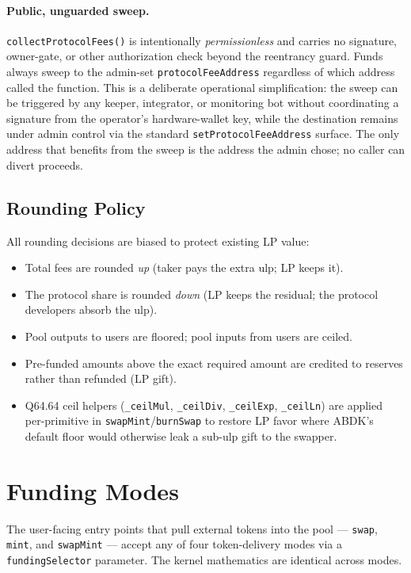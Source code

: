 \documentclass[11pt]{article}
\begin{document}
\paragraph{Public, unguarded sweep.}
\texttt{collectProtocolFees()} is intentionally \emph{permissionless} and
carries no signature, owner-gate, or other authorization check beyond the
reentrancy guard. Funds always sweep to the admin-set
\texttt{protocolFeeAddress} regardless of which address called the
function. This is a deliberate operational simplification: the sweep can
be triggered by any keeper, integrator, or monitoring bot without
coordinating a signature from the operator's hardware-wallet key, while
the destination remains under admin control via the standard
\texttt{setProtocolFeeAddress} surface. The only address that benefits
from the sweep is the address the admin chose; no caller can divert
proceeds.

\subsection{Rounding Policy}
\label{sec:rounding}

All rounding decisions are biased to protect existing LP value:

\begin{itemize}
  \item Total fees are rounded \emph{up} (taker pays the extra ulp; LP keeps
        it).
  \item The protocol share is rounded \emph{down} (LP keeps the residual; the
        protocol developers absorb the ulp).
  \item Pool outputs to users are floored; pool inputs from users are ceiled.
  \item Pre-funded amounts above the exact required amount are credited to
        reserves rather than refunded (LP gift).
  \item Q64.64 ceil helpers (\texttt{\_ceilMul}, \texttt{\_ceilDiv},
        \texttt{\_ceilExp}, \texttt{\_ceilLn}) are applied per-primitive in
        \texttt{swapMint}/\texttt{burnSwap} to restore LP favor where ABDK's
        default floor would otherwise leak a sub-ulp gift to the swapper.
\end{itemize}

\section{Funding Modes}
\label{sec:funding}

The user-facing entry points that pull external tokens into the
pool --- \texttt{swap}, \texttt{mint}, and \texttt{swapMint} --- accept any
of four token-delivery modes via a \texttt{fundingSelector} parameter.
The kernel mathematics are identical across modes.
\end{document}

